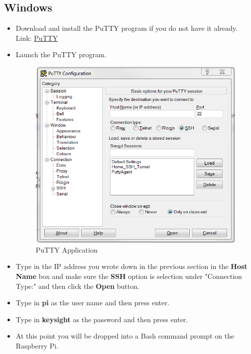 \documentclass{article}
\begin{document}
	\subsection{Windows}
	
		\begin{itemize}
			\item Download and install the PuTTY program if you do not have it already. Link: \href{https://www.chiark.greenend.org.uk/~sgtatham/putty/latest.html}{PuTTY}
			
			\item Launch the PuTTY program.
				
				\begin{figure}[H]
					\centering
					\includegraphics[width=\textwidth / 2]{pics/PuTTY.png}
					\caption{PuTTY Application}
					\label{Show_IP_app}
				\end{figure}
			
			\item Type in the IP address you wrote down in the previous section in the \textbf{Host Name} box and make sure the \textbf{SSH} option is selection under "Connection Type:" and then click the \textbf{Open} button.
			
			\item Type in \textbf{pi} as the user name and then press enter.
			
			\item Type in \textbf{keysight} as the password and then press enter.
			
			\item At this point you will be dropped into a Bash command prompt on the Raspberry Pi.
			
		\end{itemize}
	
\end{document}
